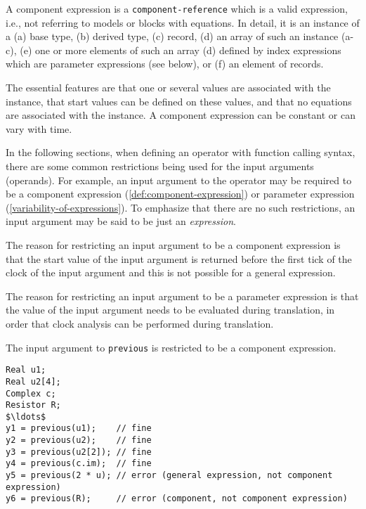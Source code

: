 \begin{definition}\label{def:component-expression}
A component expression is a \lstinline[language=grammar]!component-reference! which is a valid expression, i.e., not referring to models or blocks with equations.
In detail, it is an instance of a (a) base type, (b) derived type, (c) record, (d) an array of such an instance (a-c), (e) one or more elements of such an array (d) defined by index expressions which are parameter expressions (see below), or (f) an element of records.
\begin{nonnormative}
The essential features are that one or several values are associated with the instance, that start values can be defined on these values, and that no equations are associated with the instance.
A component expression can be constant or can vary with time.
\end{nonnormative}
\end{definition}

In the following sections, when defining an operator with function calling syntax, there are some common restrictions being used for the input arguments (operands).
For example, an input argument to the operator may be required to be a component expression (\cref{def:component-expression}) or parameter expression (\cref{variability-of-expressions}).
To emphasize that there are no such restrictions, an input argument may be said to be just an \emph{expression}.

\begin{nonnormative}
The reason for restricting an input argument to be a component expression is that the start value of the input argument is returned before the first tick of the clock of the input argument and this
is not possible for a general expression.

The reason for restricting an input argument to be a parameter expression is that the value of the input argument needs to be evaluated during translation, in order that clock analysis can be performed during translation.
\end{nonnormative}

\begin{example}
The input argument to \lstinline!previous! is restricted to be a component expression.
\begin{lstlisting}[language=modelica]
Real u1;
Real u2[4];
Complex c;
Resistor R;
$\ldots$
y1 = previous(u1);    // fine
y2 = previous(u2);    // fine
y3 = previous(u2[2]); // fine
y4 = previous(c.im);  // fine
y5 = previous(2 * u); // error (general expression, not component expression)
y6 = previous(R);     // error (component, not component expression)
\end{lstlisting}
\end{example}

